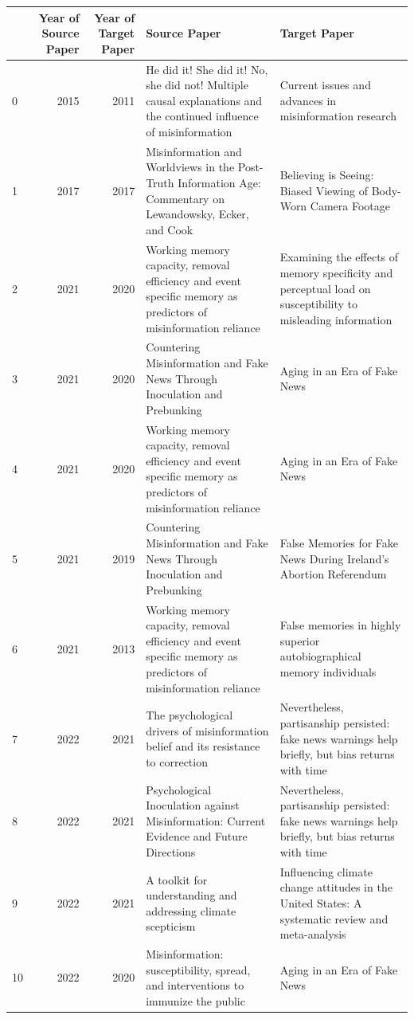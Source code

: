 \begin{tabular}{lrrll}
\toprule
 & Year of Source Paper & Year of Target Paper & Source Paper & Target Paper \\
\midrule
0 & 2015 & 2011 & He did it! She did it! No, she did not! Multiple causal explanations and the continued influence of misinformation & Current issues and advances in misinformation research \\
1 & 2017 & 2017 & Misinformation and Worldviews in the Post-Truth Information Age: Commentary on Lewandowsky, Ecker, and Cook & Believing is Seeing: Biased Viewing of Body-Worn Camera Footage \\
2 & 2021 & 2020 & Working memory capacity, removal efficiency and event specific memory as predictors of misinformation reliance & Examining the effects of memory specificity and perceptual load on susceptibility to misleading information \\
3 & 2021 & 2020 & Countering Misinformation and Fake News Through Inoculation and Prebunking & Aging in an Era of Fake News \\
4 & 2021 & 2020 & Working memory capacity, removal efficiency and event specific memory as predictors of misinformation reliance & Aging in an Era of Fake News \\
5 & 2021 & 2019 & Countering Misinformation and Fake News Through Inoculation and Prebunking & False Memories for Fake News During Ireland’s Abortion Referendum \\
6 & 2021 & 2013 & Working memory capacity, removal efficiency and event specific memory as predictors of misinformation reliance & False memories in highly superior autobiographical memory individuals \\
7 & 2022 & 2021 & The psychological drivers of misinformation belief and its resistance to correction & Nevertheless, partisanship persisted: fake news warnings help briefly, but bias returns with time \\
8 & 2022 & 2021 & Psychological Inoculation against Misinformation: Current Evidence and Future Directions & Nevertheless, partisanship persisted: fake news warnings help briefly, but bias returns with time \\
9 & 2022 & 2021 & A toolkit for understanding and addressing climate scepticism & Influencing climate change attitudes in the United States: A systematic review and meta-analysis \\
10 & 2022 & 2020 & Misinformation: susceptibility, spread, and interventions to immunize the public & Aging in an Era of Fake News \\

\end{tabular}
